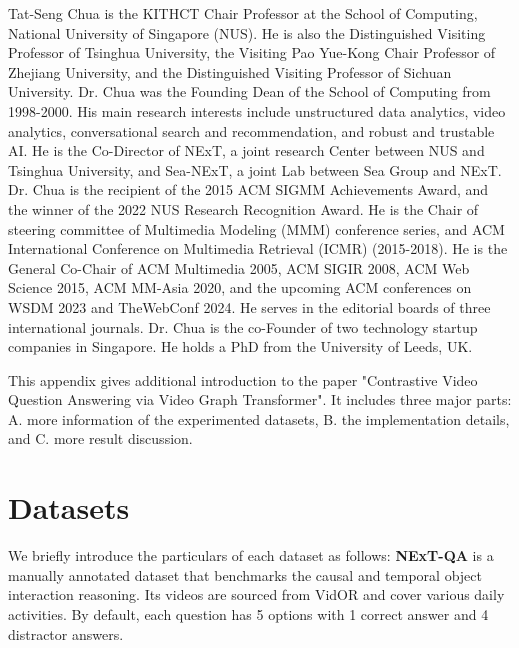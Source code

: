 \documentclass[10pt,journal,compsoc]{IEEEtran}
\begin{document}
\begin{IEEEbiography}{Tat-Seng Chua} is the KITHCT Chair Professor at the School of Computing, National University of Singapore (NUS). He is also the Distinguished Visiting Professor of Tsinghua University, the Visiting Pao Yue-Kong Chair Professor of Zhejiang University, and the Distinguished Visiting Professor of Sichuan University. Dr. Chua was the Founding Dean of the School of Computing from 1998-2000. His main research interests include unstructured data analytics, video analytics, conversational search and recommendation, and robust and trustable AI. He is the Co-Director of NExT, a joint research Center between NUS and Tsinghua University, and Sea-NExT, a joint Lab between Sea Group and NExT.
Dr. Chua is the recipient of the 2015 ACM SIGMM Achievements Award, and the winner of the 2022 NUS Research Recognition Award. He is the Chair of steering committee of Multimedia Modeling (MMM) conference series, and ACM International Conference on Multimedia Retrieval (ICMR) (2015-2018). He is the General Co-Chair of ACM Multimedia 2005, ACM SIGIR 2008, ACM Web Science 2015, ACM MM-Asia 2020, and the upcoming ACM conferences on WSDM 2023 and TheWebConf 2024. He serves in the editorial boards of three international journals. Dr. Chua is the co-Founder of two technology startup companies in Singapore. He holds a PhD from the University of Leeds, UK.
\end{IEEEbiography}

\clearpage
\appendices
This appendix gives additional introduction to the paper "Contrastive Video Question Answering via Video Graph Transformer". It includes three major parts: A. more information of the experimented datasets, B. the implementation details, and C. more result discussion. 

\section{Datasets}\label{app:dataset}

We briefly introduce the particulars of each dataset as follows: 
\noindent \textbf{NExT-QA} \cite{xiao2021next} is a manually annotated dataset that benchmarks the causal and temporal object interaction reasoning. Its videos are sourced from VidOR \cite{shang2019annotating,shang2019relation} and cover various daily activities. By default, each question has 5 options with 1 correct answer and 4 distractor answers.
\end{document}
